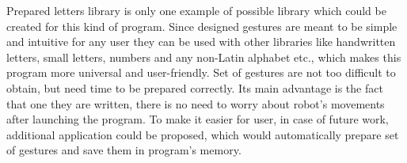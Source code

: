 Prepared letters library is only one example of possible library which could be created for this kind of program. Since designed gestures are meant to be simple and intuitive for any user they can be used with other libraries like handwritten letters, small letters, numbers and any non-Latin alphabet etc., which makes this program more universal and user-friendly. Set of gestures are not too difficult to obtain, but need time to be prepared correctly. Its main advantage is the fact that one they are written, there is no need to worry about robot’s movements after launching the program. To make it easier for user, in case of future work, additional application could be proposed, which would automatically prepare set of gestures and save them in program’s memory. 
